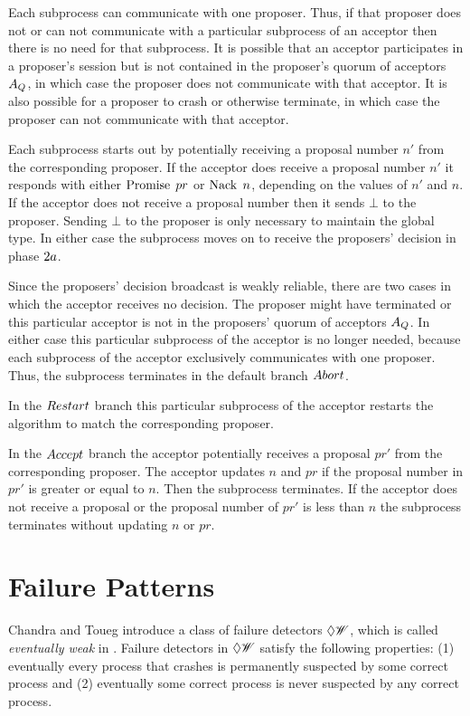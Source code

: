 Each subprocess can communicate with one proposer.
Thus, if that proposer does not or can not communicate with a particular subprocess of an acceptor then there is no need for that subprocess.
It is possible that an acceptor participates in a proposer's session but is not contained in the proposer's quorum of acceptors $A_Q$, in which case the proposer does not communicate with that acceptor.
It is also possible for a proposer to crash or otherwise terminate, in which case the proposer can not communicate with that acceptor.

Each subprocess starts out by potentially receiving a proposal number $n'$ from the corresponding proposer.
If the acceptor does receive a proposal number $n'$ it responds with either $\operatorname{Promise}\; pr$ or $\operatorname{Nack}\; n$, depending on the values of $n'$ and $n$.
If the acceptor does not receive a proposal number then it sends $\bot$ to the proposer.
Sending $\bot$ to the proposer is only necessary to maintain the global type.
In either case the subprocess moves on to receive the proposers' decision in phase $2a$.

Since the proposers' decision broadcast is weakly reliable, there are two cases in which the acceptor receives no decision.
The proposer might have terminated or this particular acceptor is not in the proposers' quorum of acceptors $A_Q$.
In either case this particular subprocess of the acceptor is no longer needed, because each subprocess of the acceptor exclusively communicates with one proposer.
Thus, the subprocess terminates in the default branch $\mathnormal{Abort}$.

In the $\mathnormal{Restart}$ branch this particular subprocess of the acceptor restarts the algorithm to match the corresponding proposer.

In the $\mathnormal{Accept}$ branch the acceptor potentially receives a proposal $pr'$ from the corresponding proposer.
The acceptor updates $n$ and $pr$ if the proposal number in $pr'$ is greater or equal to $n$.
Then the subprocess terminates.
If the acceptor does not receive a proposal or the proposal number of $pr'$ is less than $n$ the subprocess terminates without updating $n$ or $pr$.

\section{Failure Patterns}
Chandra and Toueg introduce a class of failure detectors $\Diamond\mathscr{W}$, which is called \emph{eventually weak} in \cite{failure_detectors}.
Failure detectors in $\Diamond\mathscr{W}$ satisfy the following properties: (1) eventually every process that crashes is permanently suspected by some correct process and (2) eventually some correct process is never suspected by any correct process.

